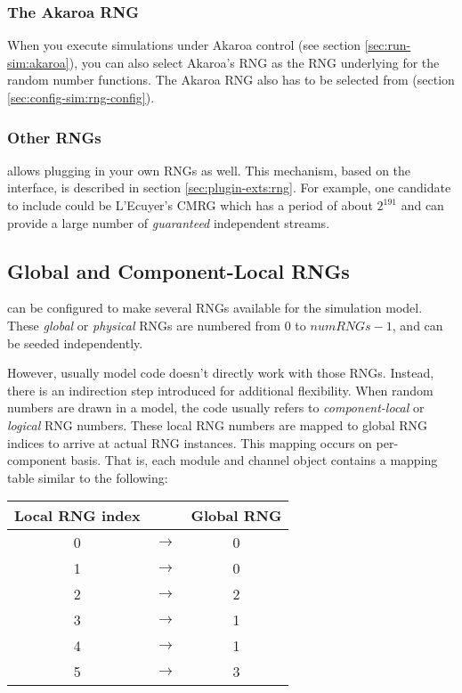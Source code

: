 \subsubsection{The Akaroa RNG}
\label{sec:sim-lib:akaroa-rng}

When you execute simulations under Akaroa control (see section
\ref{sec:run-sim:akaroa}), you can also select Akaroa's
RNG as the RNG underlying for the {\opp} random number functions.
The Akaroa RNG also has to be selected from 
(section \ref{sec:config-sim:rng-config}).

\subsubsection{Other RNGs}
\label{sec:sim-lib:other-rngs}

{\opp} allows plugging in your own RNGs as well. This mechanism,
based on the  interface, is described in section
\ref{sec:plugin-exts:rng}.
For example, one candidate to include could be L'Ecuyer's CMRG \cite{LEcuyer02}
which has a period of about $2^{191}$ and can provide a large
number of \textit{guaranteed} independent streams.


\subsection{Global and Component-Local RNGs}
\label{sec:sim-lib:global-and-component-local-rngs}

{\opp} can be configured to make several RNGs available for the simulation
model. These \textit{global} or \textit{physical} RNGs are numbered from
$0$ to $numRNGs-1$, and can be seeded independently.

However, usually model code doesn't directly work with those RNGs. Instead,
there is an indirection step introduced for additional flexibility. When
random numbers are drawn in a model, the code usually refers to
\textit{component-local} or \textit{logical} RNG numbers. These
local RNG numbers are mapped to global RNG indices to arrive at
actual RNG instances. This mapping occurs on per-component basis. That is,
each module and channel object contains a mapping table similar to the
following:

\begin{center}
\begin{tabular}{ c c c }
Local RNG index &               & Global RNG \\ \hline
              0 & $\rightarrow$ & 0 \\
              1 & $\rightarrow$ & 0 \\
              2 & $\rightarrow$ & 2 \\
              3 & $\rightarrow$ & 1 \\
              4 & $\rightarrow$ & 1 \\
              5 & $\rightarrow$ & 3 \\
\end{tabular}
\end{center}

